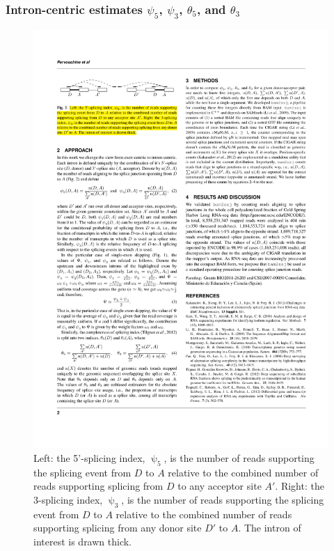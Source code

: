 \documentclass{article}
\DeclareMathOperator{\ii}{\psi}
\begin{document}
\subsubsection{Intron-centric estimates $\psi_5$, $\psi_3$, $\theta_5$, and  $\theta_3$}
\begin{figure}[h!]
\begin{center}
\includegraphics{Latex/psi_def_figure2.pdf}
\caption[Intron-centric estimates $\psi_5$, $\psi_3$, $\theta_5$, and  $\theta_3$]{Left: the 5'-splicing index, $\ii_5$, is the number of reads supporting
the splicing event from $D$ to $A$ relative to the combined number of reads supporting splicing from $D$ to any acceptor site $A'$. 
Right: the 3-splicing index, $\ii_3$, is the number of reads supporting  the splicing event from $D$ to $A$ relative to the combined 
number of reads supporting splicing from any donor site $D'$ to $A$. The intron of interest is drawn thick.}
\end{center}
\end{figure}
\end{document}
